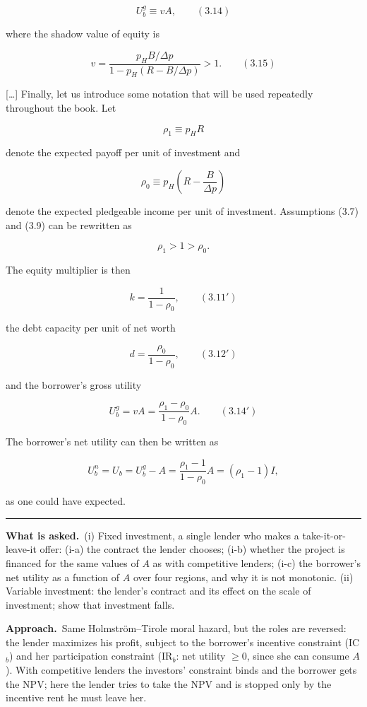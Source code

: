 \documentclass[11pt,a4paper]{article}
\newcommand{\asked}{\par\medskip\noindent\textbf{What is asked.}~}
\newcommand{\approach}{\par\smallskip\noindent\textbf{Approach.}~}
\newcommand{\stmtend}{\par\endgroup\nopagebreak\noindent\rule{\linewidth}{0.4pt}\par\medskip}
\begin{document}
\[U_b^g \equiv vA, \qquad (3.14)\]

where the shadow value of equity is

\[v = \frac{p_H B/\Delta p}{1 - p_H(R - B/\Delta p)} > 1. \qquad (3.15)\]

{[}\ldots{]} Finally, let us introduce some notation that will be used repeatedly throughout the
book. Let

\[\rho_1 \equiv p_H R\]

denote the expected payoff per unit of investment and

\[\rho_0 \equiv p_H\left(R - \frac{B}{\Delta p}\right)\]

denote the expected pledgeable income per unit of investment. Assumptions (3.7) and (3.9) can be
rewritten as

\[\rho_1 > 1 > \rho_0.\]

The equity multiplier is then

\[k = \frac{1}{1 - \rho_0}, \qquad (3.11')\]

the debt capacity per unit of net worth

\[d = \frac{\rho_0}{1 - \rho_0}, \qquad (3.12')\]

and the borrower's gross utility

\[U_b^g = vA = \frac{\rho_1 - \rho_0}{1 - \rho_0} A. \qquad (3.14')\]

The borrower's net utility can then be written as

\[U_b^n = U_b = U_b^g - A = \frac{\rho_1 - 1}{1 - \rho_0} A = (\rho_1 - 1) I,\]

as one could have expected.
\stmtend

\asked (i) Fixed investment, a single lender who makes a take-it-or-leave-it offer: (i-a) the
contract the lender chooses; (i-b) whether the project is financed for the same values of $A$ as
with competitive lenders; (i-c) the borrower's net utility as a function of $A$ over four
regions, and why it is not monotonic. (ii) Variable investment: the lender's contract and its
effect on the scale of investment; show that investment falls.

\approach Same Holmstr\"om--Tirole moral hazard, but the roles are reversed: the lender
maximizes his profit, subject to the borrower's incentive constraint (IC$_b$) and her
participation constraint (IR$_b$: net utility $\ge 0$, since she can consume $A$). With
competitive lenders the investors' constraint binds and the borrower gets the NPV; here the
lender tries to take the NPV and is stopped only by the incentive rent he must leave her.
\end{document}
